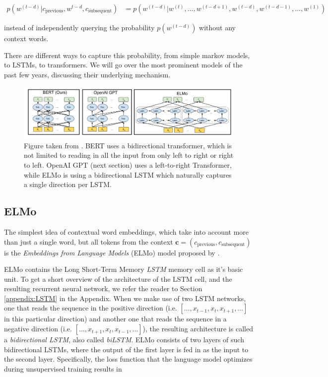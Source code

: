 \documentclass[a4paper,12pt,oneside,openright]{report}
\begin{document}
\begin{align}
p(w^{(t-d)} | c_\text{previous}, w^{t-d}, c_\text{subsequent}) &= p(w^{(t-d)} | w^{(t)}, \ldots, w^{(t-d + 1)}, w^{(t-d)}, w^{(t-d - 1)}, \ldots, w^{(1)})
\end{align}{\label{eq:transformer_probability}}

instead of independently querying the probability $p(w^{(t-d)})$ without any context words.

There are different ways to capture this probability, from simple markov models, to LSTMs, to transformers.
We will go over the most prominent models of the past few years, discussing their underlying mechanism.

\begin{figure}[h]
	\center
  \includegraphics[width=\linewidth]{./assets/background/BERT_GPT_ELMo.png}
  \caption{Figure taken from \cite{devlin18}. BERT uses a bidirectional transformer, which is not limited to reading in all the input from only left to right or right to left. OpenAI GPT (next section) uses a left-to-right Transformer, while ELMo is using a bidirectional LSTM which naturally captures a single direction per LSTM. }
  \label{fig:attention_is_all_you_need}
\end{figure}

\subsection{ELMo}

The simplest idea of contextual word embeddings, which take into account more than just a single word, but all tokens from the context $\mathbf{c} = (c_\text{previous}, c_\text{subsequent}) $is the \textit{Embeddings from Language Models} (ELMo) model proposed by \cite{peters17b}.

ELMo contains the Long Short-Term Memory \textit{LSTM} memory cell as it's basic unit.
To get a short overview of the architecture of the LSTM cell, and the resulting recurrent neural network, we refer the reader to Section \ref{appendix:LSTM} in the Appendix.
When we make use of two LSTM networks, one that reads the sequence in the positive direction (i.e. $[\ldots, x_{t-1}, x_t, x_{t+1}, \ldots]$ in this particular direction) and another one that reads the sequence in a negative direction (i.e. $[\ldots, x_{t+1}, x_t, x_{t-1}, \ldots]$), the resulting architecture is called a \textit{bidirectional LSTM}, also called \textit{biLSTM}.
ELMo consists of two layers of such bidirectional LSTMs, where the output of the first layer is fed in as the input to the second layer.
Specifically, the loss function that the language model optimizes during unsupervised training results in 
\end{document}
